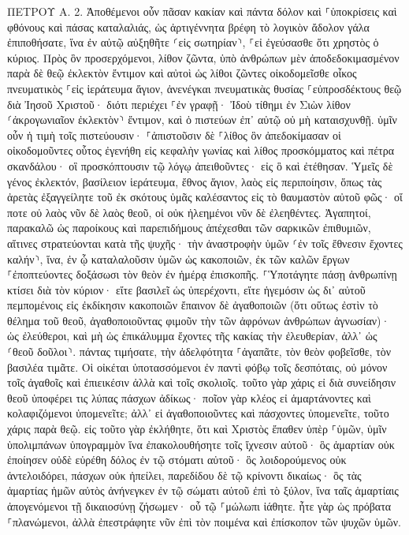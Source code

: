 \documentclass[twoside, 9pt]{extreport}
\begin{document}
ΠΕΤΡΟΥ Α.
2.
Ἀποθέμενοι οὖν πᾶσαν κακίαν καὶ πάντα δόλον καὶ ⸀ὑποκρίσεις καὶ φθόνους καὶ πάσας καταλαλιάς, 
ὡς ἀρτιγέννητα βρέφη τὸ λογικὸν ἄδολον γάλα ἐπιποθήσατε, ἵνα ἐν αὐτῷ αὐξηθῆτε ⸂εἰς σωτηρίαν⸃, 
⸀εἰ ἐγεύσασθε ὅτι χρηστὸς ὁ κύριος. 
Πρὸς ὃν προσερχόμενοι, λίθον ζῶντα, ὑπὸ ἀνθρώπων μὲν ἀποδεδοκιμασμένον παρὰ δὲ θεῷ ἐκλεκτὸν ἔντιμον 
καὶ αὐτοὶ ὡς λίθοι ζῶντες οἰκοδομεῖσθε οἶκος πνευματικὸς ⸀εἰς ἱεράτευμα ἅγιον, ἀνενέγκαι πνευματικὰς θυσίας ⸀εὐπροσδέκτους θεῷ διὰ Ἰησοῦ Χριστοῦ· 
διότι περιέχει ⸀ἐν γραφῇ· Ἰδοὺ τίθημι ἐν Σιὼν λίθον ⸂ἀκρογωνιαῖον ἐκλεκτὸν⸃ ἔντιμον, καὶ ὁ πιστεύων ἐπ᾽ αὐτῷ οὐ μὴ καταισχυνθῇ. 
ὑμῖν οὖν ἡ τιμὴ τοῖς πιστεύουσιν· ⸀ἀπιστοῦσιν δὲ ⸀λίθος ὃν ἀπεδοκίμασαν οἱ οἰκοδομοῦντες οὗτος ἐγενήθη εἰς κεφαλὴν γωνίας 
καὶ λίθος προσκόμματος καὶ πέτρα σκανδάλου· οἳ προσκόπτουσιν τῷ λόγῳ ἀπειθοῦντες· εἰς ὃ καὶ ἐτέθησαν. 
Ὑμεῖς δὲ γένος ἐκλεκτόν, βασίλειον ἱεράτευμα, ἔθνος ἅγιον, λαὸς εἰς περιποίησιν, ὅπως τὰς ἀρετὰς ἐξαγγείλητε τοῦ ἐκ σκότους ὑμᾶς καλέσαντος εἰς τὸ θαυμαστὸν αὐτοῦ φῶς· 
οἵ ποτε οὐ λαὸς νῦν δὲ λαὸς θεοῦ, οἱ οὐκ ἠλεημένοι νῦν δὲ ἐλεηθέντες. 
Ἀγαπητοί, παρακαλῶ ὡς παροίκους καὶ παρεπιδήμους ἀπέχεσθαι τῶν σαρκικῶν ἐπιθυμιῶν, αἵτινες στρατεύονται κατὰ τῆς ψυχῆς· 
τὴν ἀναστροφὴν ὑμῶν ⸂ἐν τοῖς ἔθνεσιν ἔχοντες καλήν⸃, ἵνα, ἐν ᾧ καταλαλοῦσιν ὑμῶν ὡς κακοποιῶν, ἐκ τῶν καλῶν ἔργων ⸀ἐποπτεύοντες δοξάσωσι τὸν θεὸν ἐν ἡμέρᾳ ἐπισκοπῆς. 
⸀Ὑποτάγητε πάσῃ ἀνθρωπίνῃ κτίσει διὰ τὸν κύριον· εἴτε βασιλεῖ ὡς ὑπερέχοντι, 
εἴτε ἡγεμόσιν ὡς δι᾽ αὐτοῦ πεμπομένοις εἰς ἐκδίκησιν κακοποιῶν ἔπαινον δὲ ἀγαθοποιῶν 
(ὅτι οὕτως ἐστὶν τὸ θέλημα τοῦ θεοῦ, ἀγαθοποιοῦντας φιμοῦν τὴν τῶν ἀφρόνων ἀνθρώπων ἀγνωσίαν)· 
ὡς ἐλεύθεροι, καὶ μὴ ὡς ἐπικάλυμμα ἔχοντες τῆς κακίας τὴν ἐλευθερίαν, ἀλλ᾽ ὡς ⸂θεοῦ δοῦλοι⸃. 
πάντας τιμήσατε, τὴν ἀδελφότητα ⸀ἀγαπᾶτε, τὸν θεὸν φοβεῖσθε, τὸν βασιλέα τιμᾶτε. 
Οἱ οἰκέται ὑποτασσόμενοι ἐν παντὶ φόβῳ τοῖς δεσπόταις, οὐ μόνον τοῖς ἀγαθοῖς καὶ ἐπιεικέσιν ἀλλὰ καὶ τοῖς σκολιοῖς. 
τοῦτο γὰρ χάρις εἰ διὰ συνείδησιν θεοῦ ὑποφέρει τις λύπας πάσχων ἀδίκως· 
ποῖον γὰρ κλέος εἰ ἁμαρτάνοντες καὶ κολαφιζόμενοι ὑπομενεῖτε; ἀλλ᾽ εἰ ἀγαθοποιοῦντες καὶ πάσχοντες ὑπομενεῖτε, τοῦτο χάρις παρὰ θεῷ. 
εἰς τοῦτο γὰρ ἐκλήθητε, ὅτι καὶ Χριστὸς ἔπαθεν ὑπὲρ ⸀ὑμῶν, ὑμῖν ὑπολιμπάνων ὑπογραμμὸν ἵνα ἐπακολουθήσητε τοῖς ἴχνεσιν αὐτοῦ· 
ὃς ἁμαρτίαν οὐκ ἐποίησεν οὐδὲ εὑρέθη δόλος ἐν τῷ στόματι αὐτοῦ· 
ὃς λοιδορούμενος οὐκ ἀντελοιδόρει, πάσχων οὐκ ἠπείλει, παρεδίδου δὲ τῷ κρίνοντι δικαίως· 
ὃς τὰς ἁμαρτίας ἡμῶν αὐτὸς ἀνήνεγκεν ἐν τῷ σώματι αὐτοῦ ἐπὶ τὸ ξύλον, ἵνα ταῖς ἁμαρτίαις ἀπογενόμενοι τῇ δικαιοσύνῃ ζήσωμεν· οὗ τῷ ⸀μώλωπι ἰάθητε. 
ἦτε γὰρ ὡς πρόβατα ⸀πλανώμενοι, ἀλλὰ ἐπεστράφητε νῦν ἐπὶ τὸν ποιμένα καὶ ἐπίσκοπον τῶν ψυχῶν ὑμῶν. 
\end{document}
